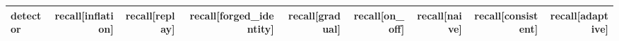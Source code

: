 \begin{tabular}{lrrrrrrrr}
\toprule
detector & recall[inflation] & recall[replay] & recall[forged\_identity] & recall[gradual] & recall[on\_off] & recall[naive] & recall[consistent] & recall[adaptive] \\
\midrule
\bottomrule
\end{tabular}
